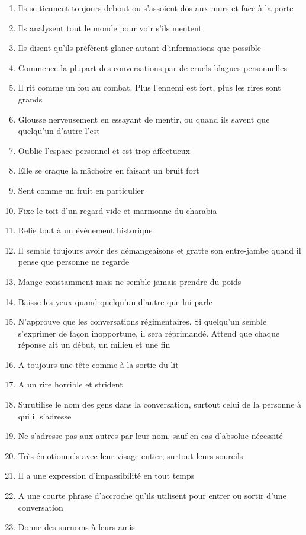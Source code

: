 \documentclass{article}
\begin{document}
\begin{multicols}{2}
\begin{enumerate}
		\item Ils se tiennent toujours debout ou s'assoient dos aux murs et face à la porte
		\item Ils analysent tout le monde pour voir s'ils mentent
		\item Ils disent qu'ils préfèrent glaner autant d'informations que possible
		\item Commence la plupart des conversations par de cruels blagues personnelles
		\item Il rit comme un fou au combat. Plus l'ennemi est fort, plus les rires sont grands
		\item Glousse nerveusement en essayant de mentir, ou quand ils savent que quelqu'un d'autre l'est
		\item Oublie l'espace personnel et est trop affectueux
		\item Elle se craque la mâchoire en faisant un bruit fort
		\item Sent comme un fruit en particulier
		\item Fixe le toit d'un regard vide et marmonne du charabia
		\item Relie tout à un événement historique
		\item Il semble toujours avoir des démangeaisons et gratte son entre-jambe quand il pense que personne ne regarde
		\item Mange constamment mais ne semble jamais prendre du poids
		\item Baisse les yeux quand quelqu'un d'autre que lui parle
		\item N'approuve que les conversations régimentaires. Si quelqu'un semble s'exprimer de façon inopportune, il sera réprimandé. Attend que chaque réponse ait un début, un milieu et une fin
		\item A toujours une tête comme à la sortie du lit
		\item A un rire horrible et strident
		\item Surutilise le nom des gens dans la conversation, surtout celui de la personne à qui il s'adresse
		\item Ne s'adresse pas aux autres par leur nom, sauf en cas d'absolue nécessité
		\item Très émotionnels avec leur visage entier, surtout leurs sourcils
		\item Il a une expression d'impassibilité en tout temps
		\item A une courte phrase d'accroche qu'ils utilisent pour entrer ou sortir d'une conversation
		\item Donne des surnoms à leurs amis

\end{enumerate}
\end{multicols}
\end{document}
